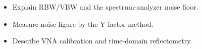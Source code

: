 \begin{objectives}
\begin{itemize}[leftmargin=1.4em,itemsep=2pt]
\item Explain RBW/VBW and the spectrum-analyzer noise floor.
\item Measure noise figure by the Y-factor method.
\item Describe VNA calibration and time-domain reflectometry.
\end{itemize}
\end{objectives}
